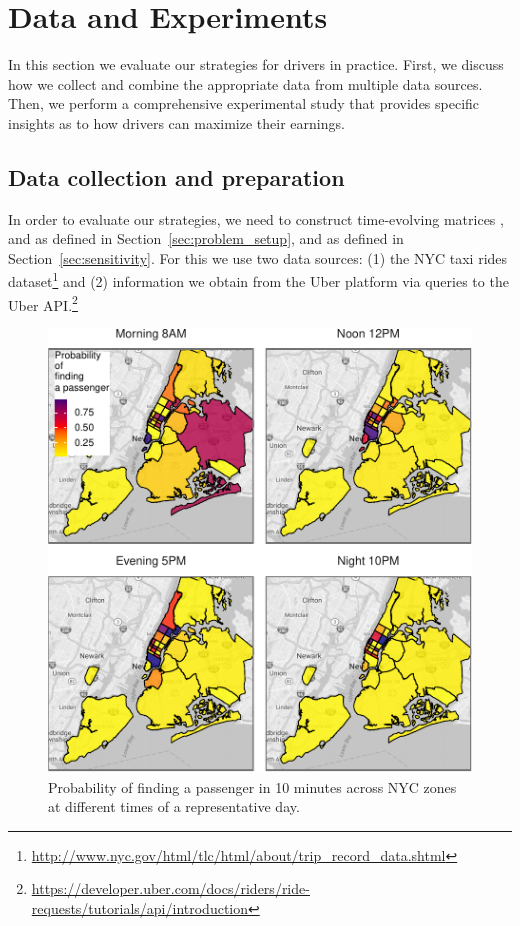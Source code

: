 
\section{Data and Experiments}
\label{sec:experiments}
In this section we  evaluate our strategies for drivers 
in practice. First, we discuss how we collect and combine the appropriate data 
from multiple data sources. Then, we perform a comprehensive experimental study
that provides
specific insights as to how drivers can maximize their earnings.

\subsection{Data collection and preparation}
In order to evaluate our strategies, we need to construct 
time-evolving matrices 
{\empiricaltransitionmatrix}, {\traveltimematrix} and {\rewardsmatrix} as defined in Section~\ref{sec:problem_setup},
and {\countmatrix} as defined in Section~\ref{sec:sensitivity}.
For this we use two data sources: (1) the NYC taxi rides 
dataset\footnote{\url{http://www.nyc.gov/html/tlc/html/about/trip_record_data.shtml}} and
(2) information we obtain from the Uber platform via queries to the Uber API.\footnote{\url{https://developer.uber.com/docs/riders/ride-requests/tutorials/api/introduction}}

\begin{figure}
	\centering
	\includegraphics{figures/successful_heatmap.pdf}
	\caption{Probability of finding a passenger in 10 minutes across NYC zones at different times of a representative day.}
	\label{fig:successful_heatmap}
\end{figure}


